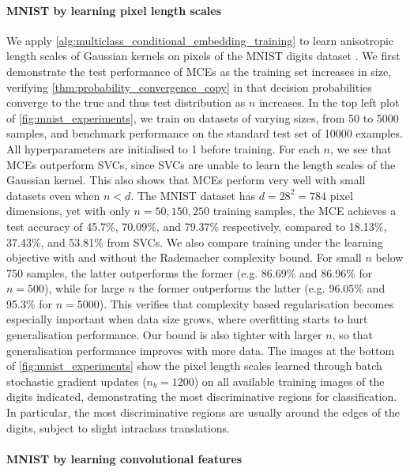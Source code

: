\documentclass[twoside]{article}
\begin{document}
	\paragraph{MNIST by learning pixel length scales}
	
	We apply \cref{alg:multiclass_conditional_embedding_training} to learn anisotropic length scales of Gaussian kernels on pixels of the MNIST digits dataset \citep{lecun1998gradient}. We first demonstrate the test performance of \gls{MCE}s as the training set increases in size, verifying \cref{thm:probability_convergence_copy} in that decision probabilities converge to the true and thus test distribution as $n$ increases. In the top left plot of \cref{fig:mnist_experiments}, we train on datasets of varying sizes, from 50 to 5000 samples, and benchmark performance on the standard test set of 10000 examples. All hyperparameters are initialised to 1 before training. For each $n$, we see that \gls{MCE}s outperform SVCs, since SVCs are unable to learn the length scales of the Gaussian kernel. This also shows that \gls{MCE}s perform very well with small datasets even when $n < d$. The MNIST dataset has $d = 28^{2} = 784$ pixel dimensions, yet with only $n = 50, 150, 250$ training samples, the \gls{MCE} achieves a test accuracy of 45.7\%, 70.09\%, and 79.37\% respectively, compared to 18.13\%, 37.43\%, and 53.81\% from SVCs. We also compare training under the learning objective with and without the Rademacher complexity bound. For small $n$ below 750 samples, the latter outperforms the former (e.g. 86.69\% and 86.96\% for $n = 500$), while for large $n$ the former outperforms the latter (e.g. 96.05\% and 95.3\% for $n= 5000$). This verifies that complexity based regularisation becomes especially important when data size grows, where overfitting starts to hurt generalisation performance. Our bound is also tighter with larger $n$, so that generalisation performance improves with more data. The images at the bottom of \cref{fig:mnist_experiments} show the pixel length scales learned through batch stochastic gradient updates ($n_{b} = 1200$) on all available training images of the digits indicated, demonstrating the most discriminative regions for classification. In particular, the most discriminative regions are usually around the edges of the digits, subject to slight intraclass translations. 
	
	\paragraph{MNIST by learning convolutional features}
	
\end{document}
